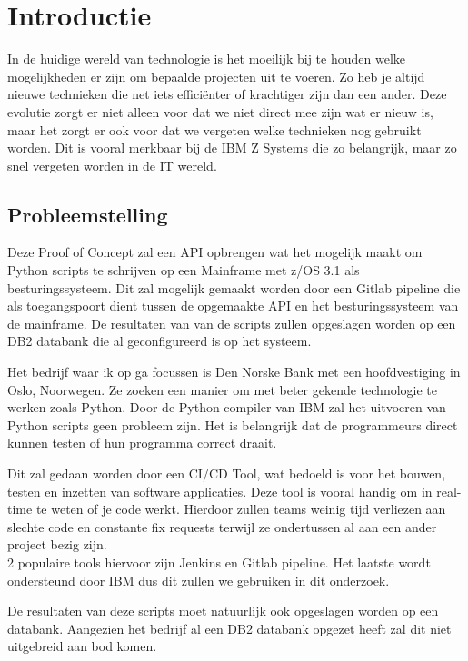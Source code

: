 
\section{Introductie}%
\label{sec:introductie}
In de huidige wereld van technologie is het moeilijk bij te houden welke mogelijkheden er zijn om bepaalde projecten uit te voeren. Zo heb je altijd nieuwe technieken die net iets efficiënter of krachtiger zijn dan een ander. Deze evolutie zorgt er niet alleen voor dat we niet direct mee zijn wat er nieuw is, maar het zorgt er ook voor dat we vergeten welke technieken nog gebruikt worden. Dit is vooral merkbaar bij de IBM Z Systems die zo belangrijk, maar zo snel vergeten worden in de IT wereld.


\subsection{Probleemstelling}
Deze Proof of Concept zal een API opbrengen wat het mogelijk maakt om Python scripts te schrijven op een Mainframe met z/OS 3.1 als besturingssysteem. Dit zal mogelijk gemaakt worden door een Gitlab pipeline die als toegangspoort dient tussen de opgemaakte API en het besturingssysteem van de mainframe. De resultaten van van de scripts zullen opgeslagen worden op een DB2 databank die al geconfigureerd is op het systeem.
 
Het bedrijf waar ik op ga focussen is Den Norske Bank met een hoofdvestiging in Oslo, Noorwegen. Ze zoeken een manier om met beter gekende technologie te werken zoals Python. Door de Python compiler van IBM zal het uitvoeren van Python scripts geen probleem zijn. Het is belangrijk dat de programmeurs direct kunnen testen of hun programma correct draait.

Dit zal gedaan worden door een CI/CD Tool, wat bedoeld is voor het bouwen, testen en inzetten van software applicaties. Deze tool is vooral handig om in real-time te weten of je code werkt. Hierdoor zullen teams weinig tijd verliezen aan slechte code en constante fix requests terwijl ze ondertussen al aan een ander project bezig zijn. \autocite{Poberezhnyk2023} \\
2 populaire tools hiervoor zijn Jenkins en Gitlab pipeline. \autocite{Mohanan2023} 
Het laatste wordt ondersteund door IBM dus dit zullen we gebruiken in dit onderzoek.

De resultaten van deze scripts moet natuurlijk ook opgeslagen worden op een databank. Aangezien het bedrijf al een DB2 databank opgezet heeft zal dit niet uitgebreid aan bod komen.


